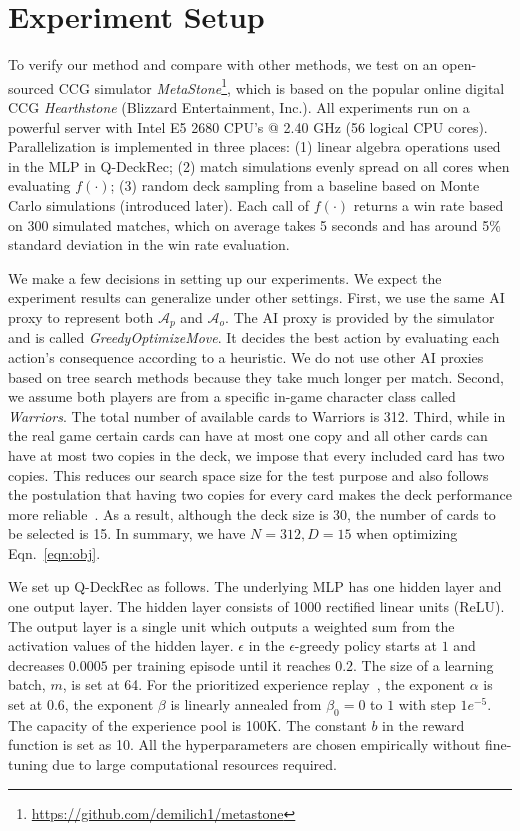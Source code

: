 \section{Experiment Setup}\label{sec:qdeckrec_exp}
To verify our method and compare with other methods, we test on an open-sourced CCG simulator \textit{MetaStone}\footnote{\url{https://github.com/demilich1/metastone}}, which is  based on the popular online digital CCG \textit{Hearthstone} (Blizzard Entertainment, Inc.). All experiments run on a powerful server with Intel E5 2680 CPU’s @ 2.40 GHz (56 logical CPU cores). Parallelization is implemented in three places: (1) linear algebra operations used in the MLP in Q-DeckRec; (2) match simulations evenly spread on all cores when evaluating $f(\cdot)$; (3) random deck sampling from a baseline based on Monte Carlo simulations (introduced later). Each call of $f(\cdot)$ returns a win rate based on 300 simulated matches, which on average takes 5 seconds and has around 5\% standard deviation in the win rate evaluation. 

We make a few decisions in setting up our experiments. We expect the experiment results can generalize under other settings. First, we use the same AI proxy to represent both $\mathcal{A}_p$ and $\mathcal{A}_o$. The AI proxy is provided by the simulator and is called \textit{GreedyOptimizeMove}. It decides the best action by evaluating each action's consequence according to a heuristic. We do not use other AI proxies based on tree search methods because they take much longer per match. Second, we assume both players are from a specific in-game character class called \textit{Warriors}. The total number of available cards to Warriors is 312. Third, while in the real game certain cards can have at most one copy and all other cards can have at most two copies in the deck, we impose that every included card has two copies. This reduces our search space size for the test purpose and also follows the postulation that having two copies for every card makes the deck performance more reliable~\cite{garcia2016evolutionary,garcia2018automated}. As a result, although the deck size is 30, the number of cards to be selected is 15. In summary, we have $N=312, D=15$ when optimizing Eqn.~\ref{eqn:obj}.
    

We set up Q-DeckRec as follows. The underlying MLP has one hidden layer and one output layer. The hidden layer consists of 1000 rectified linear units (ReLU). The output layer is a single unit which outputs a weighted sum from the activation values of the hidden layer. $\epsilon$ in the $\epsilon$-greedy policy starts at $1$ and decreases $0.0005$ per training episode until it reaches $0.2$. The size of a learning batch, $m$, is set at 64. For the prioritized experience replay~\cite{schaul2015prioritized}, the exponent $\alpha$ is set at 0.6, the exponent $\beta$ is linearly annealed from $\beta_0=0$ to $1$ with step $1e^{-5}$. The capacity of the experience pool is 100K. The constant $b$ in the reward function is set as 10. All the hyperparameters are chosen empirically without fine-tuning due to large computational resources required.  

